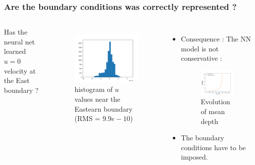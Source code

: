 \documentclass[handout]{beamer}
\begin{document}
\begin{frame}
\frametitle{Are the boundary conditions was correctly represented ?}
\begin{columns}
Has the neural net learned $u=0$ velocity at the East boundary ?
\begin{figure}
\centering
\includegraphics[width=\textwidth]{./fig/L3/u_veloocity_east.png}\\
histogram of $u$ values near the Eastearn boundary (RMS = $9.9e-10$)
\end{figure}
\pause
{}
\begin{itemize}
\item Consequence : The NN model is not conservative : 
\begin{figure}
\centering
\includegraphics[width=\textwidth]{./fig/L3/evolnw-h}\\
Evolution of mean depth
\end{figure}
\item The boundary conditions have to be imposed.
\end{itemize}
\end{columns}
\end{frame}
\end{document}
